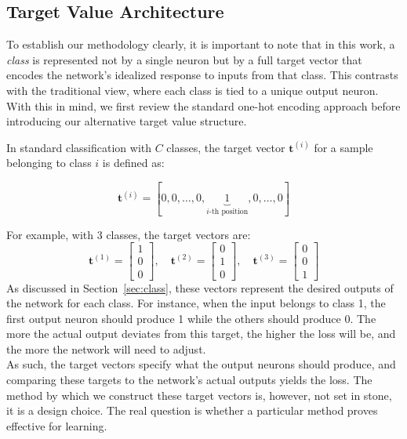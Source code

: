 \documentclass[12pt,fleqn,a4paper]{article}
\begin{document}
\subsection{Target Value Architecture}\label{sec:targets}

To establish our methodology clearly, it is important to note that in this work, a \textit{class} is represented not by a single neuron but by a full target vector that encodes the network's idealized response to inputs from that class. This contrasts with the traditional view, where each class is tied to a unique output neuron. With this in mind, we first review the standard one-hot encoding approach before introducing our alternative target value structure.

In standard classification with $C$ classes, the target vector $\mathbf{t}^{(i)}$ for a sample belonging to class $i$ is defined as:

$$\mathbf{t}^{(i)} = [0, 0, \ldots, 0, \underbrace{1}_{i\text{-th position}}, 0, \ldots, 0]$$

For example, with 3 classes, the target vectors are:
$$\mathbf{t}^{(1)} = \begin{bmatrix} 1 \\ 0 \\ 0 \end{bmatrix}, \quad 
\mathbf{t}^{(2)} = \begin{bmatrix} 0 \\ 1 \\ 0 \end{bmatrix}, \quad 
\mathbf{t}^{(3)} = \begin{bmatrix} 0 \\ 0 \\ 1 \end{bmatrix}$$
As discussed in Section~\ref{sec:class}, these vectors represent the desired outputs of the network for each class. For instance, when the input belongs to class 1, the first output neuron should produce 1 while the others should produce 0. The more the actual output deviates from this target, the higher the loss will be, and the more the network will need to adjust.\\ 

As such, the target vectors specify what the output neurons should produce, and comparing these targets to the network's actual outputs yields the loss.  The method by which we construct these target vectors is, however,  not set in stone, it is a design choice. The real question is whether a particular method proves effective for learning.
\end{document}
